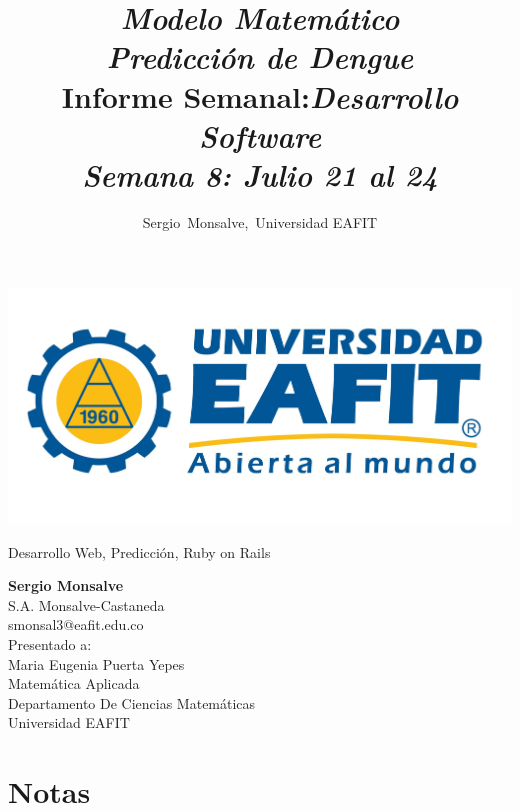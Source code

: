 \documentclass[12pt,journal,compsoc, onecolumn]{aux/IEEEtran}
\author{Sergio~Monsalve,~Universidad EAFIT}
\title{ \textbf{\textit{Modelo Matemático\\ Predicción de Dengue}}\\
Informe Semanal:\em{Desarrollo Software}\\
Semana 8: Julio 21 al 24 \\
}
\begin{document}
\pagestyle{fancyplain}
\fancyhf{}
\headheight=30pt %
\renewcommand{\headrulewidth}{0pt} %

\lhead %
{
\begin{minipage}{2cm}
\includegraphics[width=1.5 in]{aux/Logo_EAFIT.jpg}
\end{minipage}
}

\fancyfoot[c]{\thepage}

\maketitle

\begin{IEEEkeywords}
Desarrollo Web, Predicción, Ruby on Rails
\end{IEEEkeywords}

 
 \newpage
 \newpage
 \newpage

\begin{center}
\begin{IEEEbiographynophoto}{}
\textbf{Sergio Monsalve}\\
S.A. Monsalve-Castaneda \\
smonsal3@eafit.edu.co\\

Presentado a:\\
Maria Eugenia Puerta Yepes\\[0.2cm]
Matemática Aplicada\\
Departamento De Ciencias Matemáticas\\
Universidad EAFIT
\end{IEEEbiographynophoto}
\end{center}





\appendix
\chapter{Notas}

\end{document}
